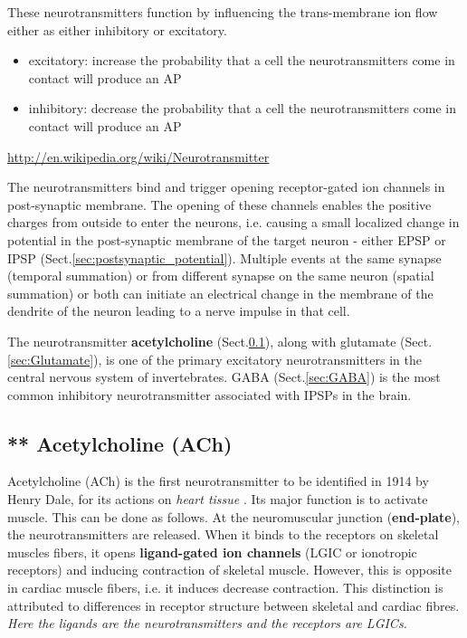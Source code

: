 These neurotransmitters function by influencing the trans-membrane ion flow
either as either inhibitory or excitatory.
\begin{itemize}
  \item excitatory: increase the probability that a cell the neurotransmitters
  come in contact will produce an AP
  
  \item inhibitory: decrease  the probability that a cell the neurotransmitters
  come in contact will produce an AP
\end{itemize}
\url{http://en.wikipedia.org/wiki/Neurotransmitter}

The neurotransmitters bind and trigger opening receptor-gated ion channels in
post-synaptic membrane. The opening of these channels enables the positive
charges from outside to enter the neurons, i.e. causing a small localized change
in potential in the post-synaptic membrane of the target neuron - either EPSP or
IPSP (Sect.\ref{sec:postsynaptic_potential}). Multiple events at the same
synapse (temporal summation) or from different synapse on the same neuron
(spatial summation) or both can initiate an electrical change in the membrane of
the dendrite of the neuron leading to a nerve impulse in that cell.


The neurotransmitter {\bf acetylcholine} (Sect.\ref{sec:Acetylcholine}), along
with glutamate (Sect.\ref{sec:Glutamate}), is one of the primary excitatory
neurotransmitters in the central nervous system of invertebrates.
GABA (Sect.\ref{sec:GABA}) is the most common inhibitory neurotransmitter
associated with IPSPs in the brain.


\subsection{** Acetylcholine (ACh)}
\label{sec:Acetylcholine}


Acetylcholine (ACh) is the first neurotransmitter to be identified in 1914 by
Henry Dale, for its actions on {\it heart tissue} \cite{Dhir1994PNT}. Its major
function is to activate muscle. This can be done as follows. At the
neuromuscular junction ({\bf end-plate}), the neurotransmitters are released.
When it binds to the receptors on skeletal muscles fibers, it opens {\bf
ligand-gated ion channels} (LGIC or ionotropic receptors) and inducing
contraction of skeletal muscle. However, this is opposite in cardiac muscle
fibers, i.e. it induces decrease contraction. This distinction is attributed to
differences in receptor structure between skeletal and cardiac fibres.
{\it Here the ligands are the neurotransmitters and the receptors are
  LGICs.}


